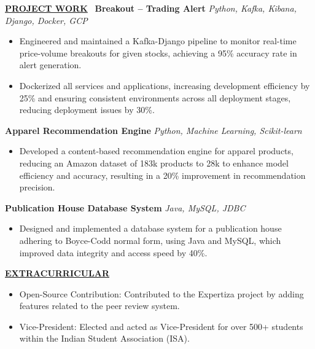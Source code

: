 \documentclass{article}
\begin{document}
\vspace{2mm} 

%
%


\noindent \textbf{\underline{PROJECT WORK}} \
\noindent \textbf{Breakout – Trading Alert} \textit{Python, Kafka, Kibana, Django, Docker, GCP} \hfill \textbf{}
\begin{itemize}[noitemsep,nolistsep,leftmargin=*]
\item {\small Engineered and maintained a Kafka-Django pipeline to monitor real-time price-volume breakouts for given stocks, achieving a 95\% accuracy rate in alert generation.}
\item {\small Dockerized all services and applications, increasing development efficiency by 25\% and ensuring consistent environments across all deployment stages, reducing deployment issues by 30\%.}
\end{itemize}

\noindent \textbf{Apparel Recommendation Engine} \textit{Python, Machine Learning, Scikit-learn} \hfill \textbf{}
\begin{itemize}[noitemsep,nolistsep,leftmargin=*]
\item {\small Developed a content-based recommendation engine for apparel products, reducing an Amazon dataset of 183k products to 28k to enhance model efficiency and accuracy, resulting in a 20\% improvement in recommendation precision.}
\end{itemize}

\noindent \textbf{Publication House Database System} \textit{Java, MySQL, JDBC} \hfill \textbf{}
\begin{itemize}[noitemsep,nolistsep,leftmargin=*]
\item {\small Designed and implemented a database system for a publication house adhering to Boyce-Codd normal form, using Java and MySQL, which improved data integrity and access speed by 40\%.}
\end{itemize}
\vspace{2mm} 
\noindent \textbf{\underline{EXTRACURRICULAR}} 
\begin{itemize}[noitemsep,nolistsep,leftmargin=*]
\item {\small Open-Source Contribution: Contributed to the Expertiza project by adding features related to the peer review system.}
\item {\small Vice-President: Elected and acted as Vice-President for over 500+ students within the Indian Student Association (ISA).}
\end{itemize}




\end{document}
